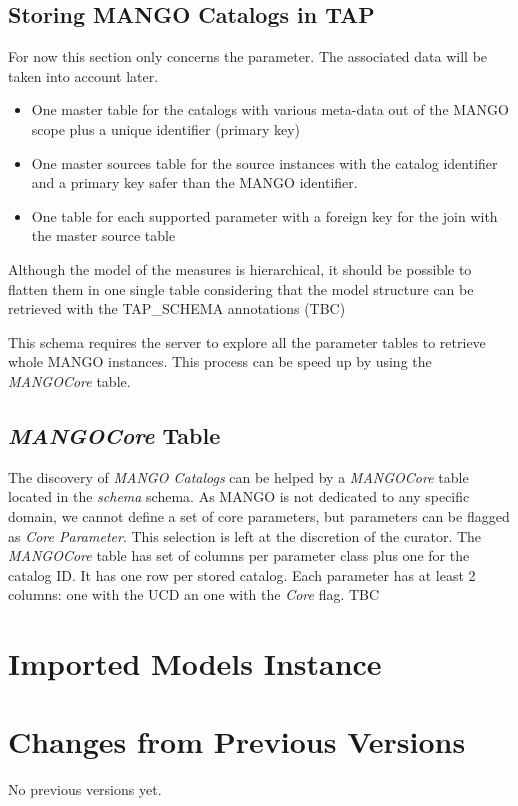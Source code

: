 \documentclass[11pt,a4paper]{ivoa}
\begin{document}
\subsection{Storing MANGO Catalogs in TAP}
For now this section only concerns the parameter. The associated data will be taken into account later.

\begin{itemize}
  \item One master table for the catalogs with various meta-data out of the MANGO scope plus a unique identifier (primary key)
  \item One master sources table for the source instances with the catalog identifier and a primary key safer than the MANGO identifier.
  \item One table for each supported parameter with a foreign key for the join with the master source table
\end{itemize}

Although the model of the measures is hierarchical, it should be possible to flatten them in one single table considering that the model structure can be retrieved with the TAP\_SCHEMA annotations (TBC)

This schema requires the server to explore all the parameter tables to retrieve  whole MANGO instances. This process can be speed up by using the \emph{MANGOCore} table.

\subsection{ \emph{MANGOCore} Table}

The discovery of \emph{MANGO Catalogs} can be helped by a  \emph{MANGOCore} table located in the  \emph{schema} schema. As MANGO is not dedicated to any specific domain, we cannot define a set of core parameters, but parameters can be flagged as \emph{Core Parameter}. This selection is left at the discretion of the curator.
The \emph{MANGOCore} table has set of columns per parameter class plus one for the catalog ID. It has one row per stored catalog. Each parameter has at least 2 columns: one with the UCD an one with the \emph{Core} flag. TBC


\appendix

\section{Imported Models Instance}

\section{Changes from Previous Versions}

No previous versions yet.



\end{document}
